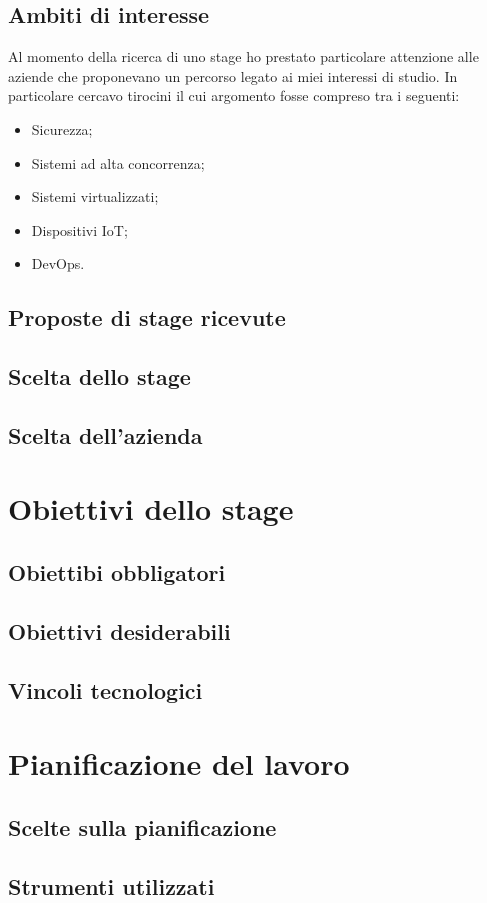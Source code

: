    \subsection{Ambiti di interesse}
   Al momento della ricerca di uno stage ho prestato particolare attenzione alle aziende che proponevano un percorso legato ai miei interessi di studio. In particolare cercavo tirocini il cui argomento fosse compreso tra i seguenti:
   \begin{itemize}
      \item{Sicurezza;}
      \item{Sistemi ad alta concorrenza;}
      \item{Sistemi virtualizzati;}
      \item{Dispositivi IoT;}
      \item{DevOps.}
   \end{itemize}

   \subsection{Proposte di stage ricevute}
   

   \subsection{Scelta dello stage}

   \subsection{Scelta dell'azienda}

\section{Obiettivi dello stage}

   \subsection{Obiettibi obbligatori}

   \subsection{Obiettivi desiderabili}

   \subsection{Vincoli tecnologici}

\section{Pianificazione del lavoro}

   \subsection{Scelte sulla pianificazione}

   \subsection{Strumenti utilizzati}